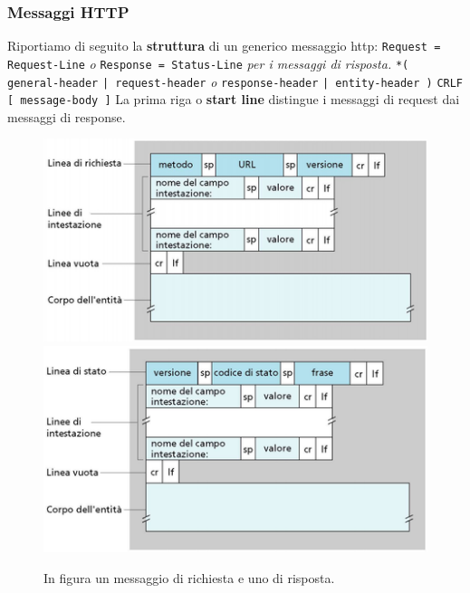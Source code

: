 \documentclass[11pt,a4paper,oneside]{book}
\theoremstyle{definition}
\begin{document}
\subsubsection{Messaggi HTTP}
Riportiamo di seguito la \textbf{struttura} di un generico messaggio http:\newline
\texttt{Request = Request-Line} \textit{o} \texttt{Response = Status-Line} \textit{per i messaggi di risposta.}\newline
\texttt{*( general-header}\newline
\texttt{| request-header} \textit{o} \texttt{response-header}\newline
\texttt{| entity-header )}\newline
\texttt{CRLF}\newline
\texttt{[ message-body ]}\newline
La prima riga o \textbf{start line} distingue i messaggi di request dai messaggi di response.
\begin{figure}[!h]
	\includegraphics[scale=0.43]{Immagini/Http_req.png}
	\includegraphics[scale=0.43]{Immagini/Http_res.png}
	\caption{In figura un messaggio di richiesta e uno di risposta.}
\end{figure}

\pagebreak
\end{document}

